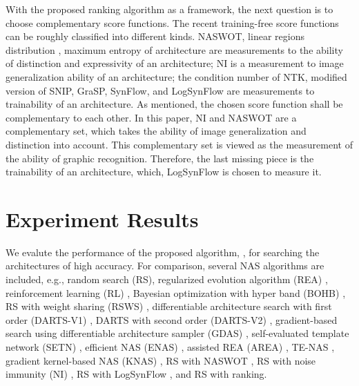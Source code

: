 \documentclass[sigconf]{acmart}
\begin{document}
    With the proposed ranking algorithm as a framework, the next question is 
    to choose complementary score functions. The recent training-free 
    score functions can be roughly classified into different kinds. NASWOT, 
    linear regions distribution \cite{https://doi.org/10.48550/arxiv.2102.11535} \cite{lin2021zennas}, 
    maximum entropy of architecture \cite{sun2022maedet} are measurements 
    to the ability of distinction and expressivity of an architecture; 
    NI is a measurement to image generalization ability of an architecture; 
    the condition number of NTK, modified version of SNIP, GraSP, SynFlow, and 
    LogSynFlow are measurements to trainability of an architecture. 
    As mentioned, the chosen score function shall be complementary to each other. 
    In this paper, NI and NASWOT are a complementary set, which takes 
    the ability of image generalization and distinction into account. 
    This complementary set is viewed as the measurement of the ability of graphic 
    recognition. Therefore, the last missing piece is the trainability of an 
    architecture, which, LogSynFlow is chosen to measure it. 

    \section{Experiment Results}
    \label{sec:results}

    We evalute the performance of the proposed algorithm, \palg{}, 
    for searching the architectures of high accuracy. For comparison, several NAS 
    algorithms are included, e.g., random search (RS), regularized evolution algorithm 
    (REA) \cite{real2019regularized}, reinforcement learning (RL) \cite{Williams:92}, 
    Bayesian optimization with hyper band (BOHB) \cite{falkner2018bohb}, RS with 
    weight sharing (RSWS) \cite{li2019random}, differentiable architecture search 
    with first order (DARTS-V1) \cite{liu2019darts}, DARTS with second order 
    (DARTS-V2) \cite{liu2019darts}, gradient-based search using differentiable 
    architecture sampler (GDAS) \cite{dong2019searching}, self-evaluated template 
    network (SETN) \cite{Dong_2019}, efficient NAS (ENAS) \cite{pham2018efficient}, 
    assisted REA (AREA) \cite{https://doi.org/10.48550/arxiv.2006.04647}, 
    TE-NAS \cite{https://doi.org/10.48550/arxiv.2102.11535}, gradient kernel-based 
    NAS (KNAS) \cite{xu2021knas}, RS with NASWOT \cite{https://doi.org/10.48550/arxiv.2006.04647}, 
    RS with noise immunity (NI) \cite{10092788}, RS with LogSynFlow \cite{Cavagnero_2023}, 
    and RS with ranking.  
\end{document}
